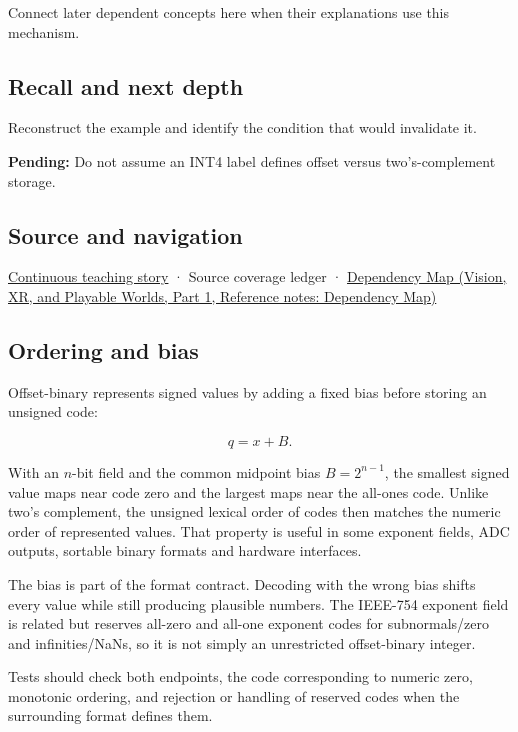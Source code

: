 Connect later dependent concepts here when their explanations use this mechanism.

\subsection{Recall and next depth}\label{appendix-53a8cfb25f8d-recall-and-next-depth}

\hypertarget{appendix-53a8cfb25f8d-recall-and-next-depth}{}

Reconstruct the example and identify the condition that would invalidate it.

\textbf{Pending:} Do not assume an INT4 label defines offset versus two's-complement storage.

\subsection{Source and navigation}\label{appendix-53a8cfb25f8d-source-and-navigation}

\hypertarget{appendix-53a8cfb25f8d-source-and-navigation}{}

\hyperref[01-foundations-i-ch001-choosing-what-information-to-keep]{Continuous teaching story} · {Source coverage ledger} · \href{../07-Vision-XR-and-Playable-Worlds-P01/main.pdf\#appendix-4ad47bdd269a}{Dependency Map (Vision, XR, and Playable Worlds, Part 1, Reference notes: Dependency Map)}

\subsection{Ordering and bias}\label{appendix-53a8cfb25f8d-ordering-and-bias}

\hypertarget{appendix-53a8cfb25f8d-ordering-and-bias}{}

Offset-binary represents signed values by adding a fixed bias before storing an unsigned code:

\[q=x+B.\]

With an \(n\)-bit field and the common midpoint bias \(B=2^{n-1}\), the smallest signed value maps near code zero and the largest maps near the all-ones code. Unlike two's complement, the unsigned lexical order of codes then matches the numeric order of represented values. That property is useful in some exponent fields, ADC outputs, sortable binary formats and hardware interfaces.

The bias is part of the format contract. Decoding with the wrong bias shifts every value while still producing plausible numbers. The IEEE-754 exponent field is related but reserves all-zero and all-one exponent codes for subnormals/zero and infinities/NaNs, so it is not simply an unrestricted offset-binary integer.

Tests should check both endpoints, the code corresponding to numeric zero, monotonic ordering, and rejection or handling of reserved codes when the surrounding format defines them.
